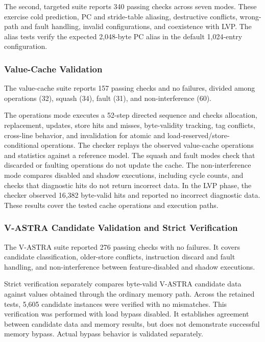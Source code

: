 The second, targeted suite reports 340 passing checks across seven modes. These exercise cold
prediction, PC and stride-table aliasing, destructive conflicts,
wrong-path and fault handling, invalid configurations, and
coexistence with LVP. The alias tests verify the expected 2,048-byte
PC alias in the default 1,024-entry configuration.

\subsubsection{Value-Cache Validation}
\label{subsubsec:vcache-validation}

The value-cache suite reports 157 passing checks and no failures, divided among operations
(32), squash (34), fault (31), and non-interference (60).

The operations mode executes a 52-step directed sequence and checks
allocation, replacement, updates, store hits and misses, byte-validity
tracking, tag conflicts, cross-line behavior, and invalidation for
atomic and load-reserved/store-conditional operations. The checker
replays the observed value-cache operations and statistics against a
reference model. The squash and fault modes check that discarded or
faulting operations do not update the cache. The non-interference mode
compares disabled and shadow executions, including cycle counts, and
checks that diagnostic hits do not return incorrect data. In the LVP
phase, the checker observed 16,382
byte-valid hits and reported no incorrect diagnostic data. These results cover the tested cache operations and execution paths.

\subsubsection{V-ASTRA Candidate Validation and Strict Verification}
\label{subsubsec:vastra-candidate-validation}

The V-ASTRA suite reported 276 passing checks
with no failures. It covers candidate classification, older-store
conflicts, instruction discard and fault handling, and
non-interference between feature-disabled and shadow executions.

Strict verification separately compares byte-valid V-ASTRA candidate
data against values obtained through the ordinary memory path. Across
the retained tests, 5,605 candidate instances were verified with no
mismatches. This verification was performed with load bypass disabled.
It establishes agreement between candidate data and memory results,
but does not demonstrate successful memory bypass. Actual bypass
behavior is validated separately.

